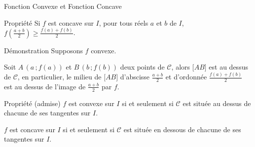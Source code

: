 \documentclass{cours}
\begin{document}
\begin{Gpartie}{Fonction Convexe et Fonction Concave}
\begin{Spartie}{Propriété}
            Si $f$ est concave sur $I$, pour tous réels $a$ et $b$ de $I$, $f\left(\frac{a+b}{2}\right)\geq\frac{f(a)+f(b)}{2}$.
            \begin{SSpartie}{Démonstration} 
                Supposons $f$ convexe.

                Soit $A\,\left(a\,; f(a)\right)$ et $B\,\left(b\,; f(b)\right)$ deux points de $\mathcal{C}$, alors $\big[AB\big]$ est au dessus de $\mathcal{C}$, en particulier, le milieu de $\big[AB\big]$ d'abscisse $\frac{a+b}{2}$ et d'ordonnée $\frac{f(a)+f(b)}{2}$ est au dessus de l'image de $\frac{a+b}{2}$ par $f$.
            \end{SSpartie}
        \end{Spartie}
        \begin{Spartie}{Propriété (admise)} 
            $f$ est convexe sur $I$ si et seulement si $\mathcal{C}$ est située au dessus de chacune de ses tangentes sur $I$.

            $f$ est concave sur $I$ si et seulement si $\mathcal{C}$ est située en dessous de chacune de ses tangentes sur $I$.

            \begin{center}
\end{center}
\end{Spartie}
\end{Gpartie}
\end{document}
